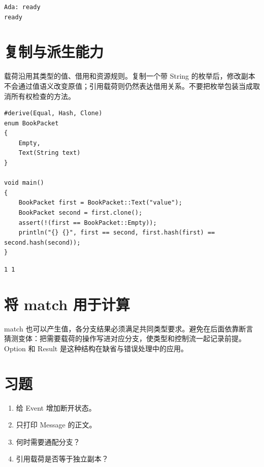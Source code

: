 \par
\medskip
\begin{lstlisting}[style=out]
Ada: ready
ready
\end{lstlisting}
\par
\medskip

\section{复制与派生能力}

载荷沿用其类型的值、借用和资源规则。复制一个带 String 的枚举后，修改副本不会通过值语义改变原值；引用载荷则仍然表达借用关系。不要把枚举包装当成取消所有权检查的方法。

\par
\medskip
\begin{lstlisting}[style=chali]
#derive(Equal, Hash, Clone)
enum BookPacket
{
    Empty,
    Text(String text)
}

void main()
{
    BookPacket first = BookPacket::Text("value");
    BookPacket second = first.clone();
    assert(!(first == BookPacket::Empty));
    println("{} {}", first == second, first.hash(first) == second.hash(second));
}
\end{lstlisting}
\par
\medskip

\par
\medskip
\begin{lstlisting}[style=out]
1 1
\end{lstlisting}
\par
\medskip

\section{将 match 用于计算}

match 也可以产生值，各分支结果必须满足共同类型要求。避免在后面依靠断言猜测变体：把需要载荷的操作写进对应分支，使类型和控制流一起记录前提。Option 和 Result 是这种结构在缺省与错误处理中的应用。

\section{习题}

\begin{enumerate}

\item 给 Event 增加断开状态。

\item 只打印 Message 的正文。

\item 何时需要通配分支？

\item 引用载荷是否等于独立副本？

\end{enumerate}


